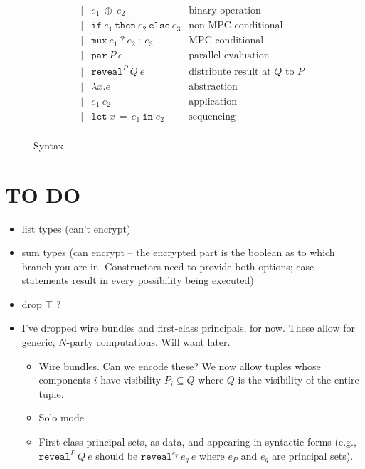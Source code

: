 \documentclass[10pt]{article}
\newcommand{\kw}[1]{\ensuremath{\mathtt{#1}}}
\newcommand{\ebinop}[2]{\ensuremath{{#1}~\oplus~{#2}}}
\newcommand{\elet}[3]{\ensuremath{\kw{let}~#1\, =\, #2~\kw{in}\;{#3}}}
\newcommand{\epar}[2]{\ensuremath{\kw{par}~{#1}~{#2}}}
\newcommand{\esec}[2]{\ensuremath{\kw{sec}~{#1}~{#2}}}
\newcommand{\ereveal}[3]{\ensuremath{\kw{reveal}^{#1}~{#2}~{#3}}}
\newcommand{\econd}[3]{\ensuremath{\kw{if}~{#1}~\kw{then}~{#2}~\kw{else}~{#3}}}
\newcommand{\emux}[3]{\ensuremath{\kw{mux}~{#1}~\kw{?}~{#2}~\kw{:}~{#3}}}
\newcommand{\elam}[2]{\ensuremath{\lambda {#1}.{#2}}}
\newcommand{\eapp}[2]{\ensuremath{{#1}~{#2}}}
\begin{document}
\begin{figure}[h]
\[\begin{array}{rlcll}
                       && \mid & \ebinop{e_1}{e_2}  & \text{binary operation} \\
                       && \mid & \econd{e_1}{e_2}{e_3}  & \text{non-MPC conditional} \\
                       && \mid & \emux{e_1}{e_2}{e_3}  & \text{MPC conditional} \\
                       && \mid & \epar{P}{e} & \text{parallel evaluation}\\
                       && \mid & \ereveal{P}{Q}{e} & \text{distribute result at $Q$ to $P$}\\
                       && \mid & \elam{x}{e}  & \text{abstraction} \\
                       && \mid & \eapp{e_1}{e_2}  & \text{application} \\
                       && \mid & \elet{x}{e_1}{e_2}  & \text{sequencing} \\
  \end{array}
  \]
  \caption{Syntax}
  \label{fig:syntax}
\end{figure}

\section{TO DO}

\begin{itemize}
\item list types (can't encrypt)
\item sum types (can encrypt -- the encrypted part is the boolean as
  to which branch you are in. Constructors need to provide both
  options; case statements result in every possibility being executed)
\item drop $\top$ ?
\item I've dropped wire bundles and first-class principals, for
  now. These allow for generic, $N$-party computations. Will want
  later.
  \begin{itemize}
  \item Wire bundles. Can we encode these? We now allow tuples whose
    components $i$ have visibility $P_i \subseteq Q$ where $Q$ is the
    visibility of the entire tuple.
  \item Solo mode
  \item First-class principal sets, as data, and appearing in
    syntactic forms (e.g., $\ereveal{P}{Q}{e}$ should be
    $\ereveal{e_q}{e_q}{e}$ where $e_P$ and $e_q$ are principal sets).
  \end{itemize}
\end{itemize}
\end{document}

